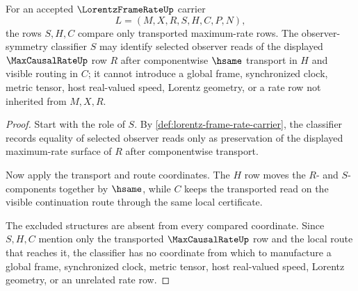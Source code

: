 \begin{theorem}
\label{thm:lorentz-frame-rate-symmetry-classifier-exactness}
For an accepted $\LorentzFrameRateUp$ carrier
$$
L=(M,X,R,S,H,C,P,N),
$$
the rows $S,H,C$ compare only transported maximum-rate rows. The observer-symmetry classifier $S$ may identify selected observer reads of the displayed $\MaxCausalRateUp$ row $R$ after componentwise $\hsame$ transport in $H$ and visible routing in $C$; it cannot introduce a global frame, synchronized clock, metric tensor, host real-valued speed, Lorentz geometry, or a rate row not inherited from $M,X,R$.
\end{theorem}
\begin{proof}
Start with the role of $S$. By \autoref{def:lorentz-frame-rate-carrier}, the classifier records equality of selected observer reads only as preservation of the displayed maximum-rate surface of $R$ after componentwise transport.

Now apply the transport and route coordinates. The $H$ row moves the $R$- and $S$-components together by $\hsame$, while $C$ keeps the transported read on the visible continuation route through the same local certificate.

The excluded structures are absent from every compared coordinate. Since $S,H,C$ mention only the transported $\MaxCausalRateUp$ row and the local route that reaches it, the classifier has no coordinate from which to manufacture a global frame, synchronized clock, metric tensor, host real-valued speed, Lorentz geometry, or an unrelated rate row.
\end{proof}

